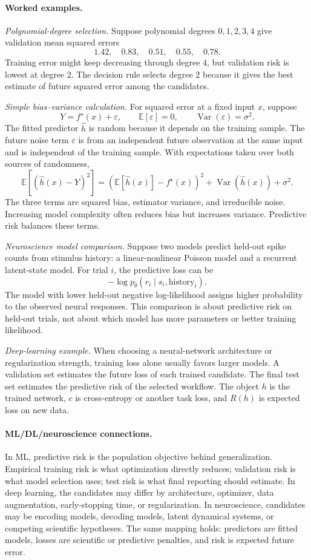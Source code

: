 \paragraph{Worked examples.}
\emph{Polynomial-degree selection.}
Suppose polynomial degrees \(0,1,2,3,4\) give validation mean squared errors
\[
1.42,\quad 0.83,\quad 0.51,\quad 0.55,\quad 0.78.
\]
Training error might keep decreasing through degree \(4\), but validation risk is lowest at degree \(2\). The decision rule selects degree \(2\) because it gives the best estimate of future squared error among the candidates.

\emph{Simple bias--variance calculation.}
For squared error at a fixed input \(x\), suppose
\[
Y=f^\star(x)+\varepsilon,\qquad \mathbb E[\varepsilon]=0,\qquad \operatorname{Var}(\varepsilon)=\sigma^2.
\]
The fitted predictor \(\hat h\) is random because it depends on the training sample. The future noise term \(\varepsilon\) is from an independent future observation at the same input and is independent of the training sample. With expectations taken over both sources of randomness,
\[
\mathbb E[(\hat h(x)-Y)^2]
=
\left(\mathbb E[\hat h(x)]-f^\star(x)\right)^2
+
\operatorname{Var}(\hat h(x))
+
\sigma^2.
\]
The three terms are squared bias, estimator variance, and irreducible noise. Increasing model complexity often reduces bias but increases variance. Predictive risk balances these terms.

\emph{Neuroscience model comparison.}
Suppose two models predict held-out spike counts from stimulus history: a linear-nonlinear Poisson model and a recurrent latent-state model. For trial \(i\), the predictive loss can be
\[
-\log p_{\hat\theta}(r_i\mid s_i,\text{history}_i).
\]
The model with lower held-out negative log-likelihood assigns higher probability to the observed neural responses. This comparison is about predictive risk on held-out trials, not about which model has more parameters or better training likelihood.

\emph{Deep-learning example.}
When choosing a neural-network architecture or regularization strength, training loss alone usually favors larger models. A validation set estimates the future loss of each trained candidate. The final test set estimates the predictive risk of the selected workflow. The object \(h\) is the trained network, \(c\) is cross-entropy or another task loss, and \(R(h)\) is expected loss on new data.

\paragraph{ML/DL/neuroscience connections.}
In ML, predictive risk is the population objective behind generalization. Empirical training risk is what optimization directly reduces; validation risk is what model selection uses; test risk is what final reporting should estimate. In deep learning, the candidates may differ by architecture, optimizer, data augmentation, early-stopping time, or regularization. In neuroscience, candidates may be encoding models, decoding models, latent dynamical systems, or competing scientific hypotheses. The same mapping holds: predictors are fitted models, losses are scientific or predictive penalties, and risk is expected future error.

